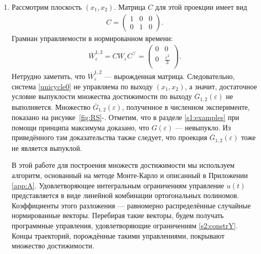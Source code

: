 \documentclass[../main.tex]{subfiles}
\begin{document}
 \begin{enumerate}
 \item Рассмотрим плоскость $ (x_1, x_2) $. 
Матрица $ C $ для этой проекции имеет вид
 \begin{gather*}
 C = \begin{pmatrix}
 1 & 0 & 0 \\
 0 & 1 & 0
 \end{pmatrix}.
 \end{gather*}
 Грамиан управляемости в нормированном времени:
 \begin{gather*}
 \overline{W}_{\varepsilon}^{1,2} = C W_{\varepsilon} C^{\top} =\begin{pmatrix}
 0 & 0 \\
 0 & \frac{\varepsilon^2}{3} \\
 \end{pmatrix}.
 \end{gather*}
 Нетрудно заметить, что $ \overline{W}_{\varepsilon}^{1,2} $ --- вырожденная матрица. 
Следовательно, система \eqref{unicycle0} не управляема по выходу $ (x_1, x_2) $, а значит, достаточное условие выпуклости множества достижимости по выходу $ \overline{G}_{1,2}(\varepsilon) $ не выполняется. 
Множество $ \overline{G}_{1,2}(\varepsilon) $, полученное в численном эксперименте, показано на рисунке~\ref{fig:RS}-. 
Отметим, что в разделе \ref{s1:examples} при помощи принципа максимума доказано, что $ G(\varepsilon) $ --- невыпукло. 
Из приведённого там доказательства также следует, что проекция $ \overline{G}_{1,2}(\varepsilon) $ тоже не является выпуклой.
 
В этой работе для построения множеств достижимости мы используем алгоритм, основанный на методе Монте-Карло и описанный в Приложении \ref{app:A}.
Удовлетворяющее интегральным ограничениям управление $ u(t) $ представляется в виде линейной комбинации ортогональных полиномов. 
Коэффициенты этого разложения --- равномерно распределённые случайные нормированные векторы. 
Перебирая такие векторы, будем получать программные управления, удовлетворяющие ограничениям \eqref{s2:constrY}. 
Концы траекторий, порождённые такими управлениями, покрывают множество достижимости.
 

\end{enumerate}
\end{document}
